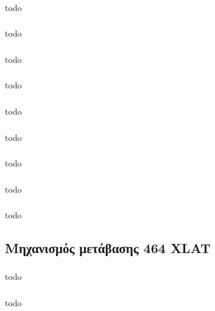 \documentclass[a4paper, 12pt]{article}
\begin{document}
		\subsubsection{}
			todo

		\subsubsection{}
			todo

		\subsubsection{}
			todo

		\subsubsection{}
			todo

		\subsubsection{}
			todo

		\subsubsection{}
			todo

		\subsubsection{}
			todo

		\subsubsection{}
			todo

		\subsubsection{}
			todo

	\subsection{Μηχανισμός μετάβασης 464 XLAT}

		\subsubsection{}
			todo

		\subsubsection{}
			todo
\end{document}
